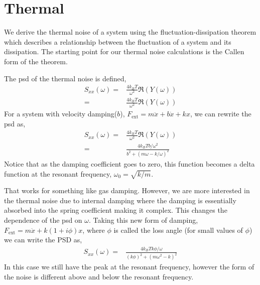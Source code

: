 \section{Thermal}

We derive the thermal noise of a system using the fluctuation-dissipation
theorem which describes a relationship between the fluctuation of a system
and its dissipation. The starting point for our thermal noise calculations
is the Callen form of the theorem. \cite{Saulson,Callen}

The \ac{psd} of the thermal noise is defined,
\begin{align}
S_{xx}(\omega) =& \frac{4 k_B T}{\omega^2} \Re (Y(\omega)) \\
    =& \frac{4 k_B T}{\omega^2} \Re (Y(\omega))
\end{align}
For a system with velocity damping($b$), $F_{\mathrm{ext}} = m\ddot{x} + b\dot{x} + kx$,
we can rewrite the \ac{psd} as,
\begin{align}
S_{xx}(\omega) =& \frac{4 k_B T}{\omega^2} \Re (Y(\omega)) \\
    =& \frac{4 k_B T b / \omega^2}{ b^2 + (m \omega - k/\omega)^2}
\end{align}
Notice that as the damping coefficient goes to zero, this function becomes a
delta function at the resonant frequency, $\omega_0 = \sqrt{k/m}$.

That works for something like gas damping. However, we are more interested in
the thermal noise due to internal damping where the damping is essentially
absorbed into the spring coefficient making it complex. This changes the
dependence of the \ac{psd} on $\omega$. Taking this new form of damping,
$F_{\mathrm{ext}} = m\ddot{x} + k(1+i\phi)x$, where $\phi$ is called the
loss angle (for small values of $\phi$) we can write the PSD as,
\begin{align}
S_{xx}(\omega) = & \frac{4 k_B T k \phi / \omega}{(k \phi)^2 +
    (m \omega^2 - k)^2}
\end{align}
In this case we still have the peak at the resonant frequency, however the form
of the noise is different above and below the resonant frequency.

